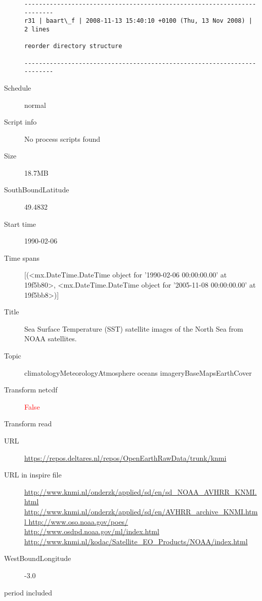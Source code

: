 \documentclass[9]{report}
\begin{document}
\begin{description}
\begin{verbatim}
------------------------------------------------------------------------
r31 | baart\_f | 2008-11-13 15:40:10 +0100 (Thu, 13 Nov 2008) | 2 lines

reorder directory structure

------------------------------------------------------------------------

\end{verbatim}
  \item[Schedule] normal
  \item[Script info] No process scripts found
  \item[Size] 18.7MB
  \item[SouthBoundLatitude] 49.4832
  \item[Start time] 1990-02-06
  \item[Time spans] [(<mx.DateTime.DateTime object for '1990-02-06 00:00:00.00' at 19f5b80>, <mx.DateTime.DateTime object for '2005-11-08 00:00:00.00' at 19f5bb8>)]
  \item[Title]  Sea Surface Temperature (SST) satellite images of the North Sea from NOAA satellites. 
  \item[Topic] climatologyMeteorologyAtmosphere oceans imageryBaseMapsEarthCover
  \item[Transform netcdf] \textcolor{red}{False}
  \item[Transform read] \textcolor{blue}{}
  \item[URL] \href{https://repos.deltares.nl/repos/OpenEarthRawData/trunk/knmi}{https://repos.deltares.nl/repos/OpenEarthRawData/trunk/knmi}
  \item[URL in inspire file] \href{http://www.knmi.nl/onderzk/applied/sd/en/sd\_NOAA\_AVHRR\_KNMI.html http://www.knmi.nl/onderzk/applied/sd/en/AVHRR\_archive\_KNMI.html http://www.oso.noaa.gov/poes/ http://www.osdpd.noaa.gov/ml/index.html http://www.knmi.nl/kodac/Satellite\_EO\_Products/NOAA/index.html}{http://www.knmi.nl/onderzk/applied/sd/en/sd\_NOAA\_AVHRR\_KNMI.html http://www.knmi.nl/onderzk/applied/sd/en/AVHRR\_archive\_KNMI.html http://www.oso.noaa.gov/poes/ http://www.osdpd.noaa.gov/ml/index.html http://www.knmi.nl/kodac/Satellite\_EO\_Products/NOAA/index.html}
  \item[WestBoundLongitude] -3.0
  \item[period included] 
\end{description}
\end{document}
